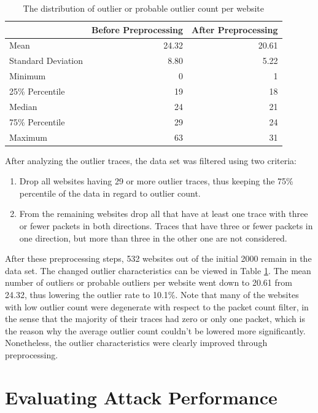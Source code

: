 \documentclass[
	ruledheaders=chapter,
	class=report,
	thesis={type=master, department=inf},
	accentcolor=1c,
	custommargins=true,
	marginpar=false,
	parskip=half-,
	fontsize=11pt,
]{tudapub}
\begin{document}
	\begin{table}
		\centering
		\begin{tabular}{lrr}
			\toprule & \textbf{Before Preprocessing} & \textbf{After Preprocessing} \\
			\midrule Mean & 24.32 & 20.61 \\
			Standard Deviation & 8.80 & 5.22 \\
			Minimum & 0 & 1\\
			25\% Percentile & 19 & 18 \\
			Median & 24 & 21 \\
			75\% Percentile & 29 & 24 \\
			Maximum & 63 & 31\\
			\bottomrule
		\end{tabular}
		\caption{The distribution of outlier or probable outlier count per website}
		\label{tbl:outlier_dist}
	\end{table}

	After analyzing the outlier traces, the data set was filtered using two criteria:
	
	\begin{enumerate}
		\item Drop all websites having 29 or more outlier traces, thus keeping the 75\% percentile of the data in regard to outlier count.
		\item From the remaining websites drop all that have at least one trace with three or fewer packets in both directions. Traces that have three or fewer packets in one direction, but more than three in the other one are not considered.
	\end{enumerate}

	After these preprocessing steps, 532 websites out of the initial 2000 remain in the data set. The changed outlier characteristics can be viewed in Table \ref{tbl:outlier_dist}. The mean number of outliers or probable outliers per website went down to 20.61 from 24.32, thus lowering the outlier rate to 10.1\%. Note that many of the websites with low outlier count were degenerate with respect to the packet count filter, in the sense that the majority of their traces had zero or only one packet, which is the reason why the average outlier count couldn't be lowered more significantly. Nonetheless, the outlier characteristics were clearly improved through preprocessing.

	\section{Evaluating Attack Performance}
	\label{pipeline}
	
\end{document}
